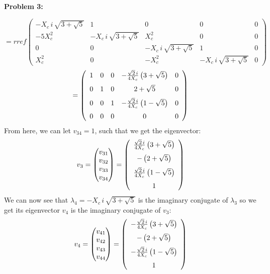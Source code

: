 \documentclass[11pt]{article}
\newcommand{\spacer}{\noalign{\medskip}}
\newenvironment{problem}[1]{\textbf{Problem #1: }}{\newpage}
\begin{document}
\begin{problem}{3}
\begin{enumerate}[label = (\alph*)]
			\[= rref\begin{pmatrix}
				-X_c\,i\,\sqrt{3 + \sqrt{5}} & 1 & 0 & 0 & 0 \\
				-5X^2_c & -X_c\,i\,\sqrt{3 + \sqrt{5}} & X^2_c & 0 & 0 \\
				0 & 0 & -X_c\,i\,\sqrt{3 + \sqrt{5}} & 1 & 0\\
				X^2_c & 0 & -X^2_c & -X_c\,i\,\sqrt{3 + \sqrt{5}} & 0
			\end{pmatrix} \]
			\[= \left(\begin{array}{ccccc}
				1 & 0 & 0 & -\frac{\sqrt{2}\,i}{4X_c}\left(3 + \sqrt{5}\right) & 0 \\
				\spacer 0 & 1 & 0 & 2 + \sqrt{5} & 0 \\
				\spacer 0 & 0 & 1 & -\frac{\sqrt{2}\,i}{4X_c}\left(1 - \sqrt{5}\right) & 0 \\
				\spacer 0 & 0 & 0 & 0 & 0
			\end{array}\right)\]
			From here, we can let $v_{34} = 1$, such that we get the eigenvector: 
			\[v_3 = \begin{pmatrix}
				v_{31} \\ v_{32} \\ v_{33} \\ v_{34}
			\end{pmatrix} = \left(\begin{array}{c}
				\frac{\sqrt{2}\,i}{4X_c}\left(3 + \sqrt{5}\right)	\\
				\spacer -\left(2 + \sqrt{5}\right) \\
				\spacer \frac{\sqrt{2}\,i}{4X_c}\left(1 - \sqrt{5}\right) \\
				\spacer 1
			\end{array}\right)\]
			We can now see that $\lambda_4 = -X_c\,i\,\sqrt{3 + \sqrt{5}}$ is the imaginary conjugate of $\lambda_3$ so we get its eigenvector $v_4$ is the imaginary conjugate of $v_3$:
			\[v_4 = \begin{pmatrix}
				v_{41} \\ v_{42} \\ v_{43} \\ v_{44}
			\end{pmatrix} = \left(\begin{array}{c}
				-\frac{\sqrt{2}\,i}{4X_c}\left(3 + \sqrt{5}\right)	\\
				\spacer -\left(2 + \sqrt{5}\right) \\
				\spacer -\frac{\sqrt{2}\,i}{4X_c}\left(1 - \sqrt{5}\right) \\
				\spacer 1
			\end{array}\right)\]

\end{enumerate}
\end{problem}
\end{document}
